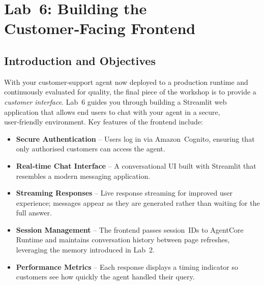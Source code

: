 
\chapter{Lab 6: Building the Customer‑Facing Frontend}
\label{chap:Lab 6: Building the Customer‑Facing Frontend}

\section{Introduction and Objectives}

With your customer‑support agent now deployed to a production runtime
and continuously evaluated for quality, the final piece of the
workshop is to provide a \emph{customer interface}.  Lab 6 guides you
through building a Streamlit web application that allows end users to
chat with your agent in a secure, user‑friendly environment.  Key
features of the frontend include:

\begin{itemize}
  \item \textbf{Secure Authentication} – Users log in via Amazon Cognito,
        ensuring that only authorised customers can access the agent.
  \item \textbf{Real‑time Chat Interface} – A conversational UI built
        with Streamlit that resembles a modern messaging application.
  \item \textbf{Streaming Responses} – Live response streaming for
        improved user experience; messages appear as they are
        generated rather than waiting for the full answer.
  \item \textbf{Session Management} – The frontend passes
        session IDs to AgentCore Runtime and maintains conversation
        history between page refreshes, leveraging the memory
        introduced in Lab 2.
  \item \textbf{Performance Metrics} – Each response displays a timing
        indicator so customers see how quickly the agent handled their
        query.
\end{itemize}

